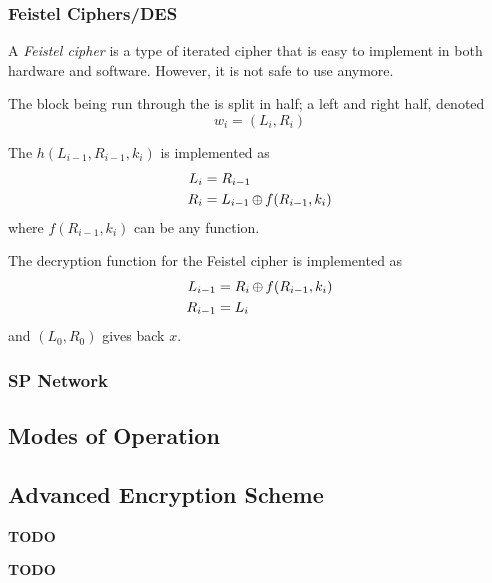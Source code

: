 \subsubsection{Feistel Ciphers/DES}\label{subsubsec:Feistel_Cipher_DES}
\begin{definition}\label{def:Feistel_Cipher}
  A \emph{Feistel cipher} is a type of iterated cipher that is easy to implement in both hardware and software.
  However, it is not safe to use anymore.

  The block being run through the  is split in half; a left and right half, denoted
  \begin{equation}\label{eq:Feistel_Cipher_Block}
    w_{i} = (L_{i}, R_{i})
  \end{equation}

  The  $h(L_{i-1}, R_{i-1}, k_{i})$ is implemented as
  \begin{equation}\label{eq:Feistel_Cipher_Round_Function_Encryption}
    \begin{aligned}
      L_{i} &= R_{i-1} \\
      R_{i} &= L_{i-1} \operatorname{\oplus} f(R_{i-1}, k_{i})
    \end{aligned}
  \end{equation}
  where $f(R_{i-1}, k_{i})$ can be any function.

  The decryption function for the Feistel cipher is implemented as
  \begin{equation}\label{eq:Feistel_Cipher_Round_Function_Decryption}
    \begin{aligned}
      L_{i-1} &= R_{i} \operatorname{\oplus} f(R_{i-1}, k_{i}) \\
      R_{i-1} &= L_{i}
    \end{aligned}
  \end{equation}
  and $(L_{0}, R_{0})$ gives back $x$.
\end{definition}

\subsubsection{SP Network}\label{subsubsec:SP_Network}

\subsection{Modes of Operation}\label{subsec:Modes_of_Operation}
\begin{definition}\label{def:Mode_of_Operation}
  
\end{definition}

\subsection{Advanced Encryption Scheme}\label{subsec:AES}
\textbf{TODO}
\begin{definition}\label{def:AES}
  \textbf{TODO}
\end{definition}

